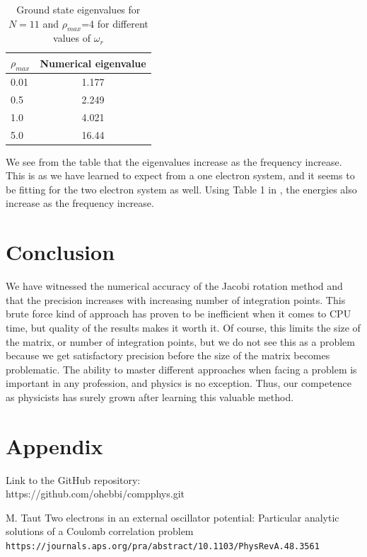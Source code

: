 \documentclass{article}
\begin{document}
\begin{table}[H]
    \centering
    \begin{tabular}{|l|c|}
    \hline
    $\rho_{max}$ & Numerical eigenvalue \\
    \hline
    0.01 & 1.177  \\
    0.5  & 2.249  \\
    1.0 & 4.021  \\
    5.0 &  16.44  \\
     \hline
    \end{tabular}
    \caption{Ground state eigenvalues for $N=11$ and $\rho_{max}$=4 for different values of $\omega_r$}
    \label{tabelur2}
\end{table}

We see from the table that the eigenvalues increase as the frequency increase. This is as we have learned to expect from a one electron system, and it seems to be fitting for the two electron system as well. Using Table 1 in \cite{M.Tant}, the energies also increase as the frequency increase.

\section{Conclusion}

We have witnessed the numerical accuracy of the Jacobi rotation method and that the precision increases with increasing number of integration points. This brute force kind of approach has proven to be inefficient when it comes to CPU time, but quality of the results makes it worth it. Of course, this limits the size of the matrix, or number of integration points, but we do not see this as a problem because we get satisfactory precision before the size of the matrix becomes problematic. The ability to master different approaches when facing a problem is important in any profession, and physics is no exception. Thus, our competence as physicists has surely grown after learning this valuable method.

\section{Appendix}
Link to the GitHub repository:\\

https://github.com/ohebbi/compphys.git

\begin{thebibliography}{}
M. Taut Two electrons in an external oscillator potential: Particular analytic solutions of a Coulomb correlation problem
\\\texttt{https://journals.aps.org/pra/abstract/10.1103/PhysRevA.48.3561}

\end{thebibliography}
\end{document}
